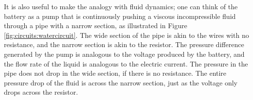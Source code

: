 It is also useful to make the analogy with fluid dynamics; one can think of the battery as a pump that is continuously pushing a viscous incompressible fluid through a pipe with a narrow section, as illustrated in Figure \ref{fig:circuits:watercircuit}. The wide section of the pipe is akin to the wires with no resistance, and the narrow section is akin to the resistor. The pressure difference generated by the pump is analogous to the voltage produced by the battery, and the flow rate of the liquid is analogous to the electric current. The pressure in the pipe does not drop in the wide section, if there is no resistance. The entire pressure drop of the fluid is across the narrow section, just as the voltage only drops across the resistor.
